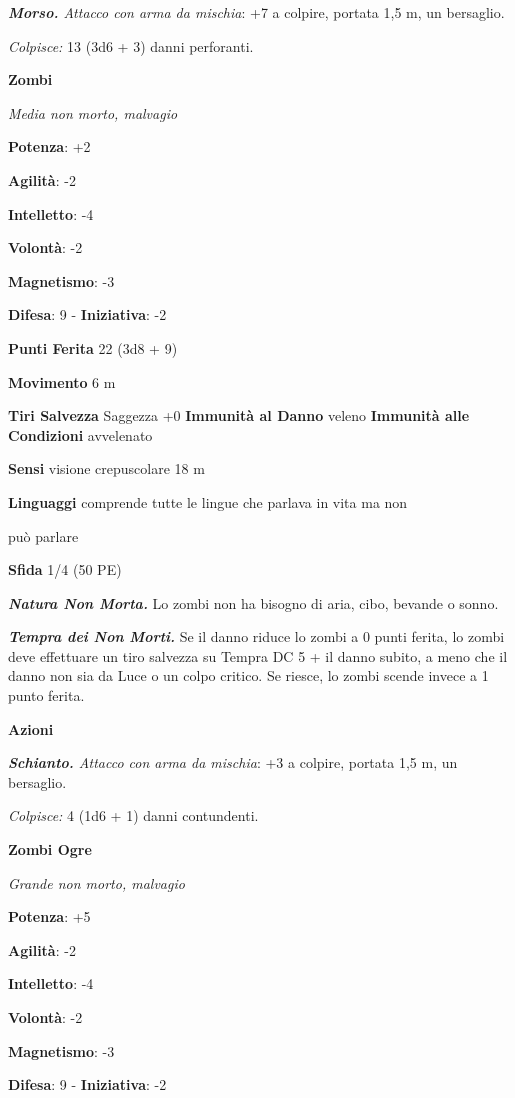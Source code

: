 \begin{multicols}{2}
\emph{\textbf{Morso.} Attacco con arma da mischia}: +7 a colpire,
portata 1,5 m, un bersaglio.

\emph{Colpisce:} 13 (3d6 + 3) danni perforanti.

\textbf{Zombi}

\emph{Media non morto, malvagio}

\textbf{Potenza}: +2

\textbf{Agilità}: -2

\textbf{Intelletto}: -4

\textbf{Volontà}: -2

\textbf{Magnetismo}: -3

\textbf{Difesa}: 9 - \textbf{Iniziativa}: -2

\textbf{Punti Ferita} 22 (3d8 + 9)

\textbf{Movimento} 6 m

\textbf{Tiri Salvezza} Saggezza +0 \textbf{Immunità al Danno} veleno
\textbf{Immunità alle Condizioni} avvelenato

\textbf{Sensi} visione crepuscolare 18 m

\textbf{Linguaggi} comprende tutte le lingue che parlava in vita ma non

può parlare

\textbf{Sfida} 1/4 (50 PE)

\emph{\textbf{Natura Non Morta.}} Lo zombi non ha bisogno di aria, cibo,
bevande o sonno.

\emph{\textbf{Tempra dei Non Morti.}} Se il danno riduce lo zombi a 0
punti ferita, lo zombi deve effettuare un tiro salvezza su Tempra
DC 5 + il danno subito, a meno che il danno non sia da Luce o un colpo
critico. Se riesce, lo zombi scende invece a 1 punto ferita.

\textbf{Azioni}

\emph{\textbf{Schianto.} Attacco con arma da mischia}: +3 a colpire,
portata 1,5 m, un bersaglio.

\emph{Colpisce:} 4 (1d6 + 1) danni contundenti.

\textbf{Zombi Ogre}

\emph{Grande non morto, malvagio}

\textbf{Potenza}: +5

\textbf{Agilità}: -2

\textbf{Intelletto}: -4

\textbf{Volontà}: -2

\textbf{Magnetismo}: -3

\textbf{Difesa}: 9 - \textbf{Iniziativa}: -2


\end{multicols}
